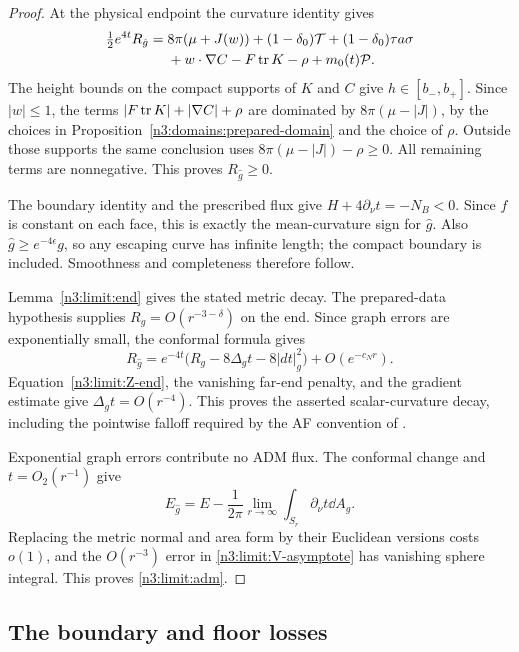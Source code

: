 \begin{proof}
At the physical endpoint the curvature identity gives
\begin{align*}
 \tfrac12e^{4t}R_{\hat g}
 ={}&8\pi(\mu+J(w))+(1-\delta_0)\mathcal T
       +(1-\delta_0)\tau a\sigma\\
    &+w\cdot\nabla C-F\operatorname{tr} K-\rho+m_0(t)\mathcal P.
\end{align*}
The height bounds on the compact supports of \(K\) and \(C\) give
\(h\in[b_-,b_+]\). Since \(|w|\le1\), the terms
\(|F\operatorname{tr} K|+|\nabla C|+\rho\) are dominated by
\(8\pi(\mu-|J|)\), by the choices in
Proposition~\ref{n3:domains:prepared-domain} and the choice of \(\rho\).
Outside those supports the same conclusion uses
\(8\pi(\mu-|J|)-\rho\ge0\).
All remaining terms are nonnegative. This proves
\(R_{\hat g}\ge0\).

The boundary identity and the prescribed flux give
\(H+4\partial_\nu t=-N_B<0\). Since \(f\) is constant on each face,
this is exactly the mean-curvature sign for \(\hat g\).
Also \(\hat g\ge e^{-4\epsilon}g\), so any escaping curve has infinite
length; the compact boundary is included. Smoothness and completeness
therefore follow.

Lemma~\ref{n3:limit:end} gives the stated metric decay. The prepared-data hypothesis supplies \(R_g=O(r^{-3-\delta})\) on the end. Since graph errors are exponentially small, the
conformal formula gives
\[
 R_{\hat g}
 =e^{-4t}\bigl(R_g-8\Delta_gt-8|dt|_g^2\bigr)
      +O(e^{-c_N r}).
\]
Equation~\eqref{n3:limit:Z-end}, the vanishing far-end penalty, and the
gradient estimate give \(\Delta_gt=O(r^{-4})\).
This proves the asserted scalar-curvature decay, including the
pointwise falloff required by the AF convention of
\cite[Definition~21 and Theorem~19]{Bray2001}.

Exponential graph errors contribute no ADM flux. The conformal change
and \(t=O_2(r^{-1})\) give
\[
 E_{\hat g}
 =E-\frac1{2\pi}\lim_{r\to\infty}
                 \int_{S_r}\partial_\nu t\dd A_g.
\]
Replacing the metric normal and area form by their Euclidean versions
costs \(o(1)\), and the \(O(r^{-3})\) error in
\eqref{n3:limit:V-asymptote} has vanishing sphere integral.
This proves \eqref{n3:limit:adm}.
\end{proof}

\subsection{The boundary and floor losses}

